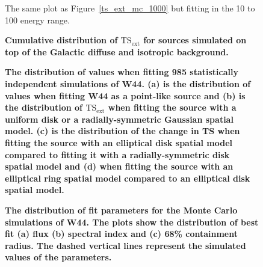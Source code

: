 \documentclass[12pt,preprint]{aastex}
\newif\ifcolorfigure
\newcommand{\gev}{\text{GeV}\xspace}
\newcommand{\tsext}{{\ensuremath{\text{TS}_{\text{ext}}}}\xspace}
\newcommand{\ts}{\text{TS}\xspace}
\newcommand{\newtext}[1]{{\bfseries \color{red}#1}}
\begin{document}
\clearpage
\begin{figure}
    \ifcolorfigure
    \plotone{mc_plots/ts_ext_emin_10000_color.eps}
    \else
    \fi
    \caption{
    The same plot as Figure~\ref{ts_ext_mc_1000} but fitting in the 10 \gev to 100 \gev energy 
    range.
    }\label{ts_ext_mc_10000}
  \end{figure}


\clearpage
\begin{figure}
    \ifcolorfigure
    \plotone{mc_plots/plot_tsext_plane_color.eps}
    \else
    \fi
    \caption{
    \newtext{
    Cumulative distribution of \tsext
    for sources simulated on top of the Galactic diffuse and isotropic background.
    }
    }\label{tsext_plane_plot}
  \end{figure}


\clearpage
\begin{figure}
    \ifcolorfigure
    \plotone{mc_plots/ts_comparison_w44sim_color.eps}
    \else
    \fi
    \caption{
    \newtext{The distribution of \ts values when fitting 985 statistically
    independent simulations of W44. (a) is the distribution of \ts values
    when fitting W44 as a point-like source and (b) is the
    distribution of \tsext when fitting the source with a uniform disk or a 
    radially-symmetric Gaussian
    spatial model. (c) is the distribution of the change in TS when
    fitting the source with an elliptical disk spatial model compared to
    fitting it with a radially-symmetric disk spatial model and (d) 
    when fitting the source with an elliptical ring spatial model compared
    to an elliptical disk spatial model.
    }
    }\label{ts_comparison_w44sim}
\end{figure}

\clearpage
\begin{figure}
    \ifcolorfigure
    \plotone{mc_plots/bias_w44sim_color.eps}
    \else
    \fi
    \caption{
    \newtext{The distribution of fit parameters
    for the Monte Carlo simulations of W44.
    The plots show the distribution of 
    best fit (a) flux (b) spectral index and (c) 68\% containment
    radius. The dashed vertical lines represent
    the simulated values of the parameters.
    }
    }\label{bias_w44sim}
\end{figure}
\end{document}
